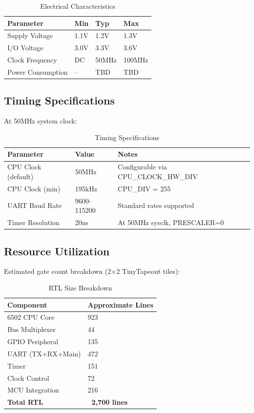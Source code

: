 \documentclass[11pt,a4paper]{article}
\begin{document}
\begin{table}[H]
\centering
\begin{tabular}{llll}
\toprule
\textbf{Parameter} & \textbf{Min} & \textbf{Typ} & \textbf{Max} \\
\midrule
Supply Voltage & 1.1V & 1.2V & 1.3V \\
I/O Voltage & 3.0V & 3.3V & 3.6V \\
Clock Frequency & DC & 50MHz & 100MHz \\
Power Consumption & -- & TBD & TBD \\
\bottomrule
\end{tabular}
\caption{Electrical Characteristics}
\end{table}

\subsection{Timing Specifications}

At 50MHz system clock:

\begin{table}[H]
\centering
\begin{tabular}{lll}
\toprule
\textbf{Parameter} & \textbf{Value} & \textbf{Notes} \\
\midrule
CPU Clock (default) & 50MHz & Configurable via CPU\_CLOCK\_HW\_DIV \\
CPU Clock (min) & 195kHz & CPU\_DIV = 255 \\
UART Baud Rate & 9600-115200 & Standard rates supported \\
Timer Resolution & 20ns & At 50MHz sysclk, PRESCALER=0 \\
\bottomrule
\end{tabular}
\caption{Timing Specifications}
\end{table}

\subsection{Resource Utilization}

Estimated gate count breakdown (2×2 TinyTapeout tiles):

\begin{table}[H]
\centering
\begin{tabular}{ll}
\toprule
\textbf{Component} & \textbf{Approximate Lines} \\
\midrule
6502 CPU Core & 923 \\
Bus Multiplexer & 44 \\
GPIO Peripheral & 135 \\
UART (TX+RX+Main) & 472 \\
Timer & 151 \\
Clock Control & 72 \\
MCU Integration & 216 \\
\midrule
\textbf{Total RTL} & \textbf{~2,700 lines} \\
\bottomrule
\end{tabular}
\caption{RTL Size Breakdown}
\end{table}
\end{document}
